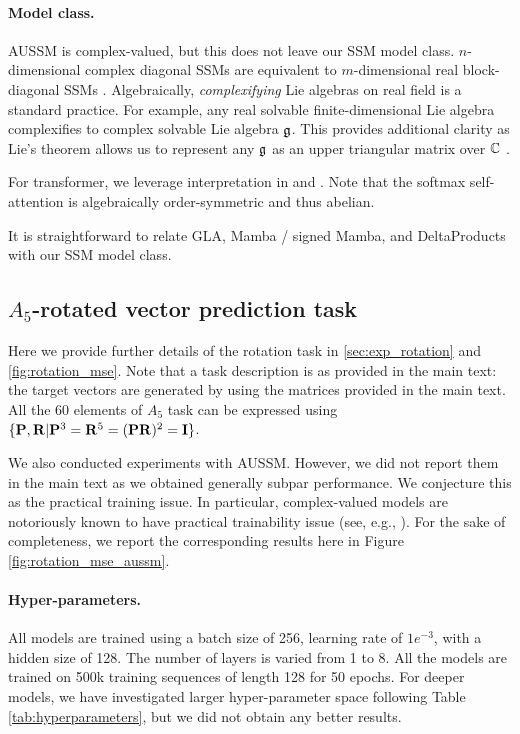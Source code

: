 \paragraph{Model class.}
AUSSM is complex-valued, but this does not leave our SSM model class.
$n$-dimensional complex diagonal SSMs are equivalent to $m$-dimensional real block-diagonal SSMs
\cite{orvieto2023resurrecting}.
Algebraically, \emph{complexifying} Lie algebras on real field is a standard practice.
For example, any real solvable finite-dimensional Lie algebra complexifies to complex solvable Lie algebra $\mathfrak{g}$.
This provides additional clarity as Lie's theorem allows us to represent any $\mathfrak{g}$ as an upper triangular matrix
over $\mathbb{C}$ \cite{hall2013lie}.

For transformer, we leverage interpretation in \citet{choromanski2020rethinking,peng2021random} and \citet{sieber2024understanding}.
Note that the softmax self-attention is algebraically order-symmetric and thus abelian.

It is straightforward to relate GLA, Mamba / signed Mamba, and DeltaProducts with our SSM model class.

\subsection{$A_5$-rotated vector prediction task}
\label{app:exp_rotation}
Here we provide further details of the rotation task in \cref{sec:exp_rotation} and \cref{fig:rotation_mse}.
Note that a task description is as provided in the main text: the target vectors are generated by using the matrices provided in the main text.
All the 60 elements of $A_5$ task can be expressed using $\{\mathbf{P}, \mathbf{R} | \mathbf{P}^3=\mathbf{R}^5=(\mathbf{PR})^2 =\mathbf{I}\}$.

We also conducted experiments with AUSSM.
However, we did not report them in the main text as we obtained generally subpar performance.
We conjecture this as the practical training issue.
In particular, complex-valued models are notoriously known to have practical trainability issue (see, e.g., \citet{elelimy0BW24}).
For the sake of completeness, we report the corresponding results here in Figure \ref{fig:rotation_mse_aussm}.

\paragraph{Hyper-parameters.} All models are trained using a batch size of 256, learning rate of $1e^{-3}$, with a hidden size of 128.
The number of layers is varied from 1 to 8.
All the models are trained on 500k training sequences of length 128 for 50 epochs.
For deeper models, we have investigated larger hyper-parameter space following Table \ref{tab:hyperparameters}, but we did not obtain any better results.


